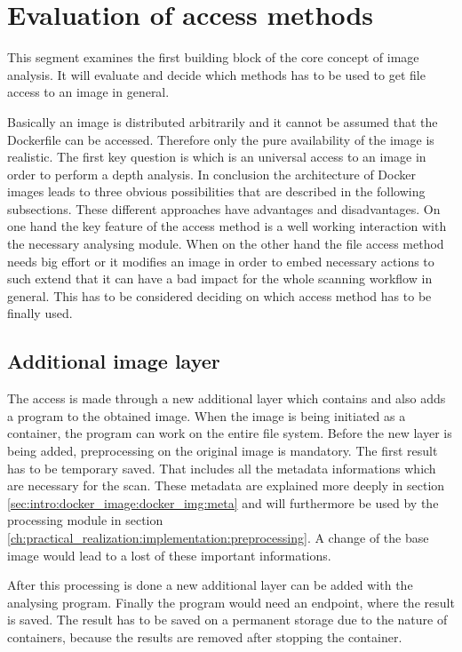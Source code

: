 \section{Evaluation of access methods}
\label{ch:theory:access_eval}
This segment examines the first building block of the core concept of image analysis. It will evaluate and decide which methods has to be used to get file access to an image in general.

Basically an image is distributed arbitrarily and it cannot be assumed that the Dockerfile can be accessed.
Therefore only the pure availability of the image is realistic. The first key question is which is an universal access to an image in order to perform a depth analysis.
In conclusion the architecture of Docker images leads to three obvious possibilities that are described in the following subsections.
These different approaches have advantages and disadvantages. On one hand the key feature of the access method is a well working interaction with the necessary analysing module. When on the other hand the file access method needs big effort or it modifies an image in order to embed necessary actions to such extend that it can have a bad impact for the whole scanning workflow in general. This has to be considered deciding on which access method has to be finally used.

\subsection{Additional image layer} 
\label{ch:theory:access_eval:additional}
The access is made through a new additional layer which contains and also adds a program to the obtained image. When the image is being initiated as a container, the program can work on the entire file system.
Before the new layer is being added, preprocessing on the original image is mandatory. The first result has to be temporary saved. That includes all the metadata informations which are necessary for the scan. These metadata are explained more deeply in section \ref{sec:intro:docker_image:docker_img:meta} and will furthermore be used by the processing module in section \ref{ch:practical_realization:implementation:preprocessing}. A change of the base image would lead to a lost of these important informations. 

After this processing is done a new additional layer can be added with the analysing program.
Finally the program would need an endpoint, where the result is saved. The result has to be saved on a permanent storage due to the nature of containers, because the results are removed after stopping the container. 

